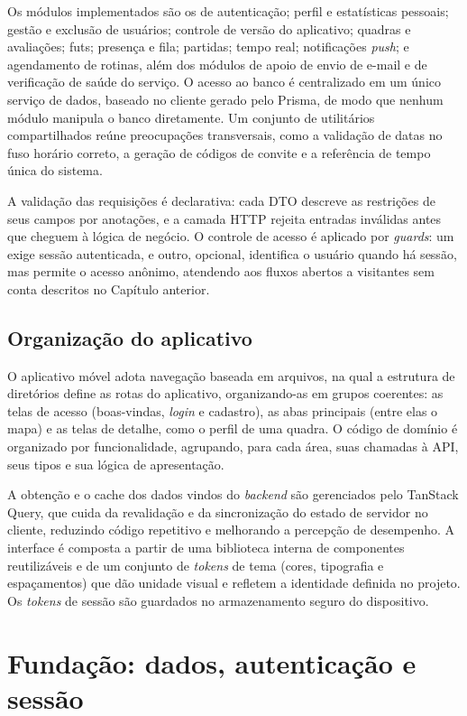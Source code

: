       Os módulos implementados são os de autenticação; perfil e estatísticas pessoais; gestão e exclusão de usuários; controle de versão do aplicativo; quadras e avaliações; futs; presença e fila; partidas; tempo real; notificações \textit{push}; e agendamento de rotinas, além dos módulos de apoio de envio de e-mail e de verificação de saúde do serviço. O acesso ao banco é centralizado em um único serviço de dados, baseado no cliente gerado pelo Prisma, de modo que nenhum módulo manipula o banco diretamente. Um conjunto de utilitários compartilhados reúne preocupações transversais, como a validação de datas no fuso horário correto, a geração de códigos de convite e a referência de tempo única do sistema.

      A validação das requisições é declarativa: cada DTO descreve as restrições de seus campos por anotações, e a camada HTTP rejeita entradas inválidas antes que cheguem à lógica de negócio. O controle de acesso é aplicado por \textit{guards}: um exige sessão autenticada, e outro, opcional, identifica o usuário quando há sessão, mas permite o acesso anônimo, atendendo aos fluxos abertos a visitantes sem conta descritos no Capítulo anterior.

    \subsection{Organização do aplicativo}
      O aplicativo móvel adota navegação baseada em arquivos, na qual a estrutura de diretórios define as rotas do aplicativo, organizando-as em grupos coerentes: as telas de acesso (boas-vindas, \textit{login} e cadastro), as abas principais (entre elas o mapa) e as telas de detalhe, como o perfil de uma quadra. O código de domínio é organizado por funcionalidade, agrupando, para cada área, suas chamadas à API, seus tipos e sua lógica de apresentação.

      A obtenção e o cache dos dados vindos do \textit{backend} são gerenciados pelo TanStack Query, que cuida da revalidação e da sincronização do estado de servidor no cliente, reduzindo código repetitivo e melhorando a percepção de desempenho. A interface é composta a partir de uma biblioteca interna de componentes reutilizáveis e de um conjunto de \textit{tokens} de tema (cores, tipografia e espaçamentos) que dão unidade visual e refletem a identidade definida no projeto. Os \textit{tokens} de sessão são guardados no armazenamento seguro do dispositivo.

\section{Fundação: dados, autenticação e sessão}
  \label{sec:dev-fundacao}

